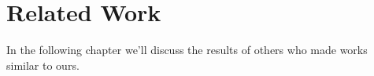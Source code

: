 \chapter{Related Work}

In the following chapter we'll discuss the results of others who
made works similar to ours.
